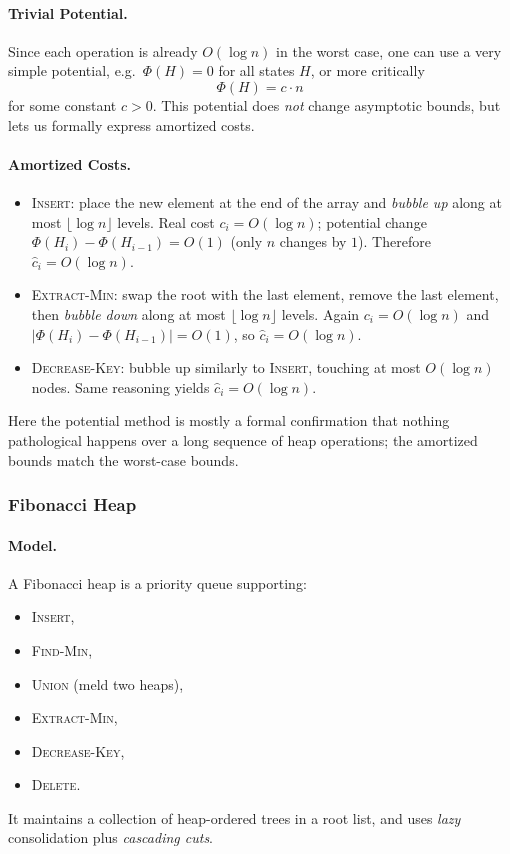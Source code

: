 \documentclass[9pt]{extarticle}
\begin{document}
\paragraph{Trivial Potential.}
Since each operation is already $O(\log n)$ in the worst case, one can use a very simple potential,
e.g.\ $\Phi(H) = 0$ for all states $H$, or more critically
\[
  \Phi(H) = c \cdot n
\]
for some constant $c > 0$.
This potential does \emph{not} change asymptotic bounds, but lets us formally express amortized costs.

\paragraph{Amortized Costs.}
\begin{itemize}
  \item \textsc{Insert}: place the new element at the end of the array and \emph{bubble up} along at most $\lfloor \log n \rfloor$ levels.  
  Real cost $c_i = O(\log n)$; potential change $\Phi(H_i)-\Phi(H_{i-1}) = O(1)$
  (only $n$ changes by $1$).  
  Therefore $\hat c_i = O(\log n)$.

  \item \textsc{Extract-Min}: swap the root with the last element, remove the last element,
  then \emph{bubble down} along at most $\lfloor \log n \rfloor$ levels.  
  Again $c_i = O(\log n)$ and $|\Phi(H_i)-\Phi(H_{i-1})|=O(1)$, so $\hat c_i = O(\log n)$.

  \item \textsc{Decrease-Key}: bubble up similarly to \textsc{Insert}, touching at most
  $O(\log n)$ nodes.  
  Same reasoning yields $\hat c_i = O(\log n)$.
\end{itemize}

Here the potential method is mostly a formal confirmation that nothing pathological happens
over a long sequence of heap operations; the amortized bounds match the worst-case bounds.

\subsubsection{Fibonacci Heap}

\paragraph{Model.}
A Fibonacci heap is a priority queue supporting:
\begin{itemize}
  \item \textsc{Insert},
  \item \textsc{Find-Min},
  \item \textsc{Union} (meld two heaps),
  \item \textsc{Extract-Min},
  \item \textsc{Decrease-Key},
  \item \textsc{Delete}.
\end{itemize}
It maintains a collection of heap-ordered trees in a root list,
and uses \emph{lazy} consolidation plus \emph{cascading cuts}.
\end{document}

